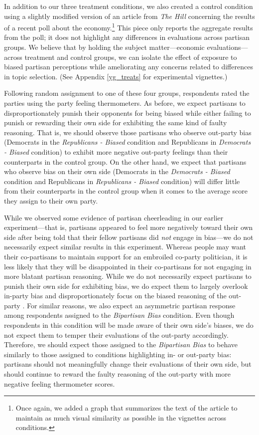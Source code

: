 \documentclass[12pt, letterpaper]{article}
\begin{document}
In addition to our three treatment conditions, we also created a control condition using a slightly modified version of an article from \textit{The Hill} concerning the results of a recent poll about the economy.\footnote{Once again, we added a graph that summarizes the text of the article to maintain as much visual similarity as possible in the vignettes across conditions.} This piece only reports the aggregate results from the poll; it does not highlight any differences in evaluations across partisan groups. We believe that by holding the subject matter---economic evaluations---across treatment and control groups, we can isolate the effect of exposure to biased partisan perceptions while ameliorating any concerns related to differences in topic selection. (See Appendix \ref{yg_treats} for experimental vignettes.) 

Following random assignment to one of these four groups, respondents rated the parties using the party feeling thermometers. As before, we expect partisans to disproportionately punish their opponents for being biased while either failing to punish or rewarding their own side for exhibiting the same kind of faulty reasoning. That is, we should observe those partisans who observe out-party bias (Democrats in the \textit{Republicans - Biased} condition and Republicans in \textit{Democrats - Biased} condition) to exhibit more negative out-party feelings than their counterparts in the control group. On the other hand, we expect that partisans who observe bias on their own side (Democrats in the \textit{Democrats - Biased} condition and Republicans in \textit{Republicans - Biased} condition) will differ little from their counterparts in the control group when it comes to the average score they assign to their own party. 

While we observed some evidence of partisan cheerleading in our earlier experiment---that is, partisans appeared to feel more negatively toward their own side after being told that their fellow partisans did \textit{not} engage in bias---we do not necessarily expect similar results in this experiment. Whereas people may want their co-partisans to maintain support for an embroiled co-party politician, it is less likely that they will be disappointed in their co-partisans for not engaging in more blatant partisan reasoning. While we do not necessarily expect partisans to punish their own side for exhibiting bias, we do expect them to largely overlook in-party bias and disproportionately focus on the biased reasoning of the out-party \citep{proninetal_2002,pronin_2007}. For similar reasons, we also expect an asymmetric partisan response among respondents assigned to the \textit{Bipartisan Bias} condition. Even though respondents in this condition will be made aware of their own side's biases, we do not expect them to temper their evaluations of the out-party accordingly. Therefore, we should expect those assigned to the \textit{Bipartisan Bias} to behave similarly to those assigned to conditions highlighting in- or out-party bias: partisans should not meaningfully change their evaluations of their own side, but should continue to reward the faulty reasoning of the out-party with more negative feeling thermometer scores. 
\end{document}
